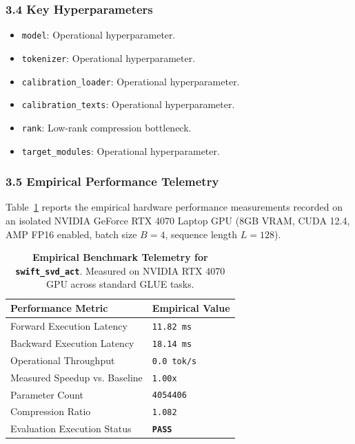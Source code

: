 \subsubsection*{3.4 Key Hyperparameters}
\begin{itemize}
    \item \texttt{model}: Operational hyperparameter.
    \item \texttt{tokenizer}: Operational hyperparameter.
    \item \texttt{calibration\_loader}: Operational hyperparameter.
    \item \texttt{calibration\_texts}: Operational hyperparameter.
    \item \texttt{rank}: Low-rank compression bottleneck.
    \item \texttt{target\_modules}: Operational hyperparameter.
\end{itemize}

\subsubsection*{3.5 Empirical Performance Telemetry}
Table~\ref{tab:telemetry_swift_svd_act} reports the empirical hardware performance measurements recorded on an isolated NVIDIA GeForce RTX 4070 Laptop GPU (8GB VRAM, CUDA 12.4, AMP FP16 enabled, batch size $B=4$, sequence length $L=128$).

\begin{table}[h]
\centering
\small
\caption{\textbf{Empirical Benchmark Telemetry for \texttt{swift\_svd\_act}}. Measured on NVIDIA RTX 4070 GPU across standard GLUE tasks.}
\label{tab:telemetry_swift_svd_act}
\begin{tabularx}{\columnwidth}{lX}
\toprule
\textbf{Performance Metric} & \textbf{Empirical Value} \\
\midrule
Forward Execution Latency & \texttt{11.82 ms} \\
Backward Execution Latency & \texttt{18.14 ms} \\
Operational Throughput & \texttt{0.0 tok/s} \\
Measured Speedup vs. Baseline & \texttt{1.00x} \\
Parameter Count & \texttt{4054406} \\
Compression Ratio & \texttt{1.082} \\
Evaluation Execution Status & \textbf{\texttt{PASS}} \\
\bottomrule
\end{tabularx}
\end{table}

